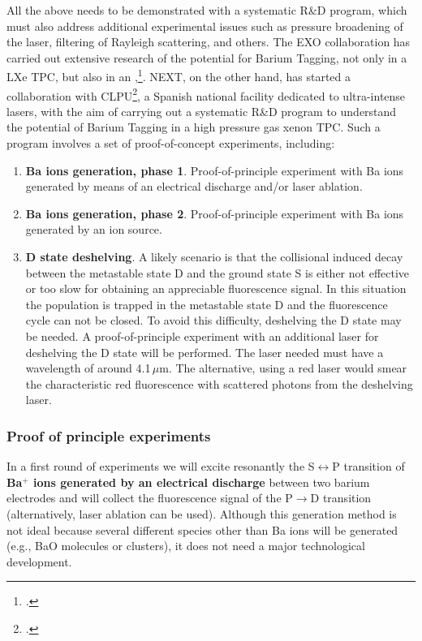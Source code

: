 All the above needs to be demonstrated with a systematic R\&D program, which must also address additional experimental issues such as pressure broadening of the laser, filtering of Rayleigh scattering, and others. The EXO collaboration has carried out extensive research of the potential for Barium Tagging, not only in a LXe TPC, but also in an \HPXE,\footcite{Sinclair:2011zz}. NEXT, on the other hand, has started a collaboration with CLPU\footcite{clpu}, a Spanish national facility dedicated to ultra-intense lasers, with the aim of carrying out a systematic R\&D program to understand the potential of Barium Tagging in a high pressure gas xenon TPC. Such a program
involves a set of proof-of-concept experiments, including:

\begin{enumerate}
	\item \textbf{Ba ions generation, phase 1}. Proof-of-principle experiment with Ba ions generated by means of an electrical discharge and/or laser ablation.
	
	\item \textbf{Ba ions generation, phase 2}. Proof-of-principle experiment with Ba ions generated by an ion source.	
		
	\item \textbf{D state deshelving}. A likely scenario is that the collisional induced decay between the metastable state D and the ground state S is either not effective or too slow for obtaining an appreciable fluorescence signal. In this situation the population is trapped in the metastable state D and the fluorescence cycle can not be closed. To avoid this difficulty, deshelving the D state may be needed. A proof-of-principle experiment with an additional laser for deshelving the D state will be performed. The laser needed must have a wavelength of around 4.1\,$\mu$m. The alternative, using a red laser would smear the characteristic red fluorescence with scattered photons from the deshelving laser.
\end{enumerate}

\subsubsection*{Proof of principle experiments}

In a first round of experiments we will excite resonantly the S$\leftrightarrow$P transition of {\bf Ba$^+$ ions generated by an electrical discharge} between two barium electrodes and will collect the fluorescence signal of the P$\rightarrow$D transition (alternatively, laser ablation can be used). Although this generation method is not ideal because several different species other than Ba ions will be generated (e.g., BaO molecules or clusters), it does not need a major technological development.

